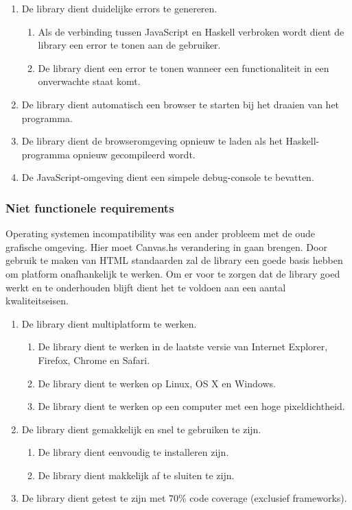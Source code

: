 \begin{enumerate}[label={R\arabic*}]
\setcounter{enumi}{\value{startvalue}}
	\item \label{req:errors} De library dient duidelijke errors te genereren.
	\begin{enumerate}[label={R\arabic{enumi}.\arabic*}]
		\item Als de verbinding tussen JavaScript en Haskell verbroken wordt dient de library een error te tonen aan de gebruiker. 
		\item De library dient een error te tonen wanneer een functionaliteit in een onverwachte staat komt.
	\end{enumerate}
	\item \label{req:launchbrowser} De library dient automatisch een browser te starten bij het draaien van het programma.
	\item \label{req:reload} De library dient de browseromgeving opnieuw te laden als het Haskell-programma opnieuw gecompileerd wordt.
	\item \label{req:debug} De JavaScript-omgeving dient een simpele debug-console te bevatten.
	\setcounter{startvalue}{\value{enumi}}
\end{enumerate}

\subsubsection{Niet functionele requirements}
Operating systemen incompatibility was een ander probleem met de oude grafische omgeving. Hier moet Canvas.hs verandering in gaan brengen. Door gebruik te maken van HTML standaarden zal de library een goede basis hebben om platform onafhankelijk te werken. Om er voor te zorgen dat de library goed werkt en te onderhouden blijft dient het te voldoen aan een aantal kwaliteitseisen.

\begin{enumerate}[label={R\arabic*}]
\setcounter{enumi}{\value{startvalue}}
	\item \label{req:multiplatform} De library dient multiplatform te werken.
	\begin{enumerate}[label={R\arabic{enumi}.\arabic*}]
		\item De library dient te werken in de laatste versie van Internet Explorer, Firefox, Chrome en Safari.
		\item De library dient te werken op Linux, OS X en Windows.
		\item De library dient te werken op een computer met een hoge pixeldichtheid.
	\end{enumerate}
	\item \label{req:performance} De library dient gemakkelijk en snel te gebruiken te zijn.
	\begin{enumerate}[label={R\arabic{enumi}.\arabic*}]
		\item De library dient eenvoudig te installeren zijn.
		\item De library dient makkelijk af te sluiten te zijn.
	\end{enumerate}
	\item \label{req:coverage} De library dient getest te zijn met 70\% code coverage (exclusief frameworks).
\end{enumerate}

